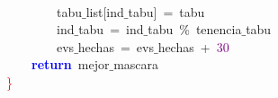 \mbox{} \\
\mbox{}\ \ \ \ \ \ \ \ tabu$\_$list\textcolor{BrickRed}{[}ind$\_$tabu\textcolor{BrickRed}{]}\ \textcolor{BrickRed}{=}\ tabu \\
\mbox{}\ \ \ \ \ \ \ \ ind$\_$tabu\ \textcolor{BrickRed}{=}\ ind$\_$tabu\ \textcolor{BrickRed}{\%}\ tenencia$\_$tabu \\
\mbox{}\ \ \ \ \ \ \ \ evs$\_$hechas\ \textcolor{BrickRed}{=}\ evs$\_$hechas\ \textcolor{BrickRed}{+}\ \textcolor{Purple}{30} \\
\mbox{}\ \ \ \ \textbf{\textcolor{Blue}{return}}\ mejor$\_$mascara \\
\mbox{}\textcolor{Red}{\}} \\
\mbox{}
